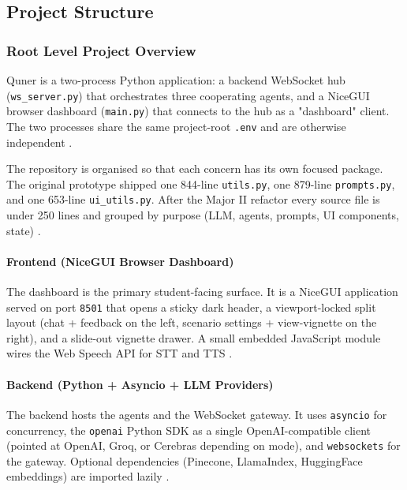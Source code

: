 \documentclass{article}
\begin{document}
\subsection{Project Structure}

\subsubsection{Root Level Project Overview}

Quner is a two-process Python application: a backend WebSocket hub (\texttt{ws\_server.py}) that orchestrates three cooperating agents, and a NiceGUI browser dashboard (\texttt{main.py}) that connects to the hub as a "dashboard" client. The two processes share the same project-root \texttt{.env} and are otherwise independent \cite{Cheptsov2013IntroducingAN}.

The repository is organised so that each concern has its own focused package. The original prototype shipped one 844-line \texttt{utils.py}, one 879-line \texttt{prompts.py}, and one 653-line \texttt{ui\_utils.py}. After the Major II refactor every source file is under 250 lines and grouped by purpose (LLM, agents, prompts, UI components, state) \cite{Rygl2017SemanticVE}.

\paragraph{Frontend (NiceGUI Browser Dashboard)}
The dashboard is the primary student-facing surface. It is a NiceGUI application served on port \texttt{8501} that opens a sticky dark header, a viewport-locked split layout (chat + feedback on the left, scenario settings + view-vignette on the right), and a slide-out vignette drawer. A small embedded JavaScript module wires the Web Speech API for STT and TTS \cite{Portovaras2024CurrentTA}.

\paragraph{Backend (Python + Asyncio + LLM Providers)}
The backend hosts the agents and the WebSocket gateway. It uses \texttt{asyncio} for concurrency, the \texttt{openai} Python SDK as a single OpenAI-compatible client (pointed at OpenAI, Groq, or Cerebras depending on mode), and \texttt{websockets} for the gateway. Optional dependencies (Pinecone, LlamaIndex, HuggingFace embeddings) are imported lazily \cite{Topsakal2023CreatingLL,Monir2024VectorSearchED}.
\end{document}
